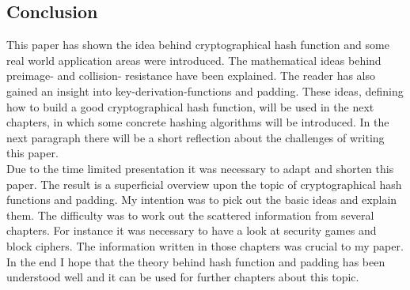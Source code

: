 \documentclass[a4paper,11pt, twoside]{article}
\begin{document}
\subsection{Conclusion}
This paper has shown the idea behind cryptographical hash function and some real world application areas were introduced. The mathematical ideas behind preimage- and collision- resistance have been explained. The reader has also gained an insight into key-derivation-functions and padding. These ideas, defining how to build a good cryptographical hash function, will be used in the next chapters, in which some concrete hashing algorithms will be introduced. In the next paragraph there will be a short reflection about the challenges of writing this paper.\newline\\[0.1cm]
Due to the time limited presentation it was necessary to adapt and shorten this paper. The result is a superficial overview upon the topic of cryptographical hash functions and padding. My intention was to pick out the basic ideas and explain them. The difficulty was to work out the scattered information from several chapters. For instance it was necessary to have a look at security games and block ciphers. The information written in those chapters was crucial to my paper.\newline
In the end I hope that the theory behind hash function and padding has been understood well and it can be used for further chapters about this topic.




\end{document}
